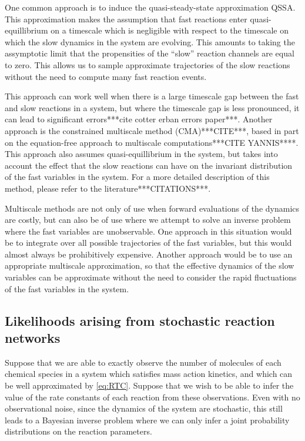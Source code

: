 \documentclass[final]{siamltex}
\begin{document}
One common approach is to induce the quasi-steady-state approximation
QSSA. This approximation makes the assumption that fast reactions
enter quasi-equillibrium on a timescale which is negligible with
respect to the timescale on which the slow dynamics in the system are
evolving. This amounts to taking the assymptotic limit that the
propensities of the ``slow'' reaction channels are equal to zero. This
allows us to sample approximate trajectories of the slow reactions
without the need to compute many fast reaction events.

This approach can work well when there is a large timescale gap
between the fast and slow reactions in a system, but where the
timescale gap is less pronounced, it can lead to significant
errors***cite cotter erban errors paper***. Another approach is the
constrained multiscale method (CMA)***CITE***, based in part on the
equation-free approach to multiscale computations***CITE
YANNIS****. This approach also assumes quasi-equillibrium in the
system, but takes into account the effect that the slow reactions can
have on the invariant distribution of the fast variables in the
system. For a more detailed description of this method, please refer
to the literature***CITATIONS***.

Multiscale methods are not only of use when forward evaluations of the
dynamics are costly, but can also be of use where we attempt to solve
an inverse problem where the fast variables are unobservable. One
approach in this situation would be to integrate over all possible
trajectories of the fast variables, but this would almost always be
prohibitively expensive. Another approach would be to use an
appropriate multiscale approximation, so that the effective dynamics
of the slow variables can be approximate without the need to consider
the rapid fluctuations of the fast variables in the system.

\subsection{Likelihoods arising from stochastic reaction networks}
Suppose that we are able to exactly observe the number of molecules of
each chemical species in a system which satisfies mass action
kinetics, and which can be well approximated by
\eqref{eq:RTC}. Suppose that we wish to be able to infer the value of
the rate constants of each reaction from these observations. Even with no observational noise, since the dynamics
of the system are stochastic, this still leads to a Bayesian inverse
problem where we can only infer a joint probability distributions on the
reaction parameters.
\end{document}
